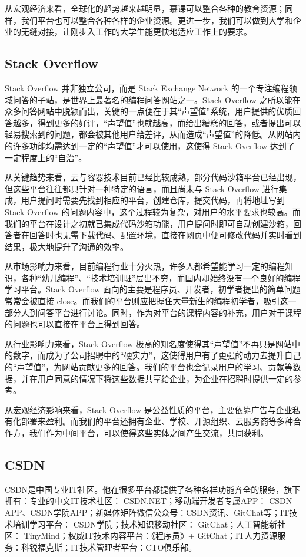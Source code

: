 \documentclass[a4paper]{ctexart}
\begin{document}
从宏观经济来看，全球化的趋势越来越明显，慕课可以整合各种的教育资源；同样，我们平台也可以整合各种各样的企业资源。更进一步，我们可以做到大学和企业的无缝对接，让刚步入工作的大学生能更快地适应工作上的要求。 


\subsection{Stack Overflow}
Stack Overflow 并非独立公司，而是 Stack Exchange Network 的一个专注编程领域问答的子站，是世界上最著名的编程问答网站之一。Stack Overflow 之所以能在众多问答网站中脱颖而出，关键的一点便在于其“声望值”系统，用户提供的优质回答越多，得到更多的好评，“声望值”也就越高，而给出糟糕的回答，或者提出可以轻易搜索到的问题，都会被其他用户给差评，从而造成“声望值”的降低。从网站内的许多功能均需达到一定的“声望值”才可以使用，这使得 Stack Overflow 达到了一定程度上的“自治”。

从关键趋势来看，云与容器技术目前已经比较成熟，部分代码沙箱平台已经出现，但这些平台往往都只针对一种特定的语言，而且尚未与 Stack Overflow 进行集成，用户提问时需要先找到相应的平台，创建仓库，提交代码，再将地址写到 Stack Overflow 的问题内容中，这个过程较为复杂，对用户的水平要求也较高。而我们的平台在设计之初就已集成代码沙箱功能，用户提问时即可自动创建沙箱，回答者在回答时也无需下载代码、配置环境，直接在网页中便可修改代码并实时看到结果，极大地提升了沟通的效率。

从市场影响力来看，目前编程行业十分火热，许多人都希望能学习一定的编程知识，各种“幼儿编程”、“技术培训班”层出不穷，而国内却始终没有一个良好的编程学习平台。Stack Overflow 面向的主要是程序员、开发者，初学者提出的简单问题常常会被直接 close。而我们的平台则应把握住大量新生的编程初学者，吸引这一部分人到问答平台进行讨论。同时，作为对平台的课程内容的补充，用户对于课程的问题也可以直接在平台上得到回答。

从行业影响力来看，Stack Overflow 极高的知名度使得其“声望值”不再只是网站中的数字，而成为了公司招聘中的“硬实力”，这使得用户有了更强的动力去提升自己的“声望值”，为网站贡献更多的回答。我们的平台也会记录用户的学习、贡献等数据，并在用户同意的情况下将这些数据共享给企业，为企业在招聘时提供一定的参考。

从宏观经济影响来看，Stack Overflow 是公益性质的平台，主要依靠广告与企业私有化部署来盈利。而我们的平台还拥有企业、学校、开源组织、云服务商等多种合作方，我们作为中间平台，可以使得这些实体之间产生交流，共同获利。


\subsection{CSDN}
CSDN是中国专业IT社区。他在很多平台都提供了各种各样功能齐全的服务，旗下拥有：专业的中文IT技术社区： CSDN.NET；移动端开发者专属APP： CSDN APP、CSDN学院APP；新媒体矩阵微信公众号：CSDN资讯、GitChat等；IT技术培训学习平台： CSDN学院；技术知识移动社区： GitChat；人工智能新社区： TinyMind；权威IT技术内容平台：《程序员》+ GitChat；IT人力资源服务：科锐福克斯；IT技术管理者平台：CTO俱乐部。
\end{document}
